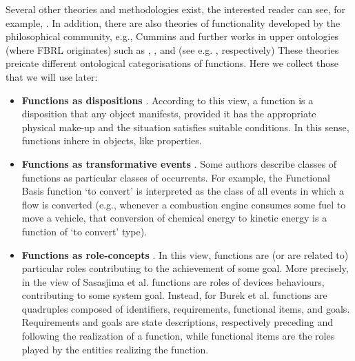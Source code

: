 \documentclass[
]{ceurart}
\begin{document}
Several other theories and methodologies exist, the interested reader can see, for example, \cite{umedaFunctionBehaviourStructure1990,qianFunctionBehaviorStructure1996, zhaoStateBehaviorFunction2019}.
In addition, there are also theories of functionality developed by the philosophical community, e.g., Cummins \cite{cumminsFunctionalAnalysis1975} and further works in upper ontologies (where FBRL originates) such as \BFO, \GFO, \YAMATO and \DOLCE (see e.g. \cite{spearFunctionsBasicFormal2016, herreGeneralFormalOntology2006, sasajimaFBRLFunctionBehavior1995, borgoFormalOntologicalPerspective2009}, respectively)
These theories preicate different ontological categorisations of functions. 
Here we collect those that we will use later:
\begin{itemize}
  \item \textbf{Functions as dispositions} \cite{arpFunctionRoleDisposition2008, barryBasicFormalOntology2015}. According to this view, a function is a disposition that any object manifests, provided it has the appropriate physical make-up and the situation satisfies suitable conditions. In this sense, functions inhere in objects, like properties. 
  \item \textbf{Functions as transformative events} \cite{borgoFormalizationFunctionsOperations2011, garbaczTwoOntologydrivenFormalisations2011, garbaczStandardTaxonomyArtifact2005}.
  Some authors describe classes of functions as particular classes of occurrents. For example, the Functional Basis function `to convert' is interpreted as the class of all events in which a flow is converted (e.g., whenever a combustion engine consumes some fuel to move a vehicle, that conversion of chemical energy to kinetic energy is a function of `to convert' type).%
  \item \textbf{Functions as role-concepts} \cite{sasajimaFBRLFunctionBehavior1995,burekToplevelOntologyFunctions2006}. In this view, functions are (or are related to) particular roles contributing to the achievement of some goal. More precisely, in the view of Sasasjima et al. \cite{sasajimaFBRLFunctionBehavior1995} functions are roles of devices behaviours, contributing to some system goal. Instead, for Burek et al. \cite{burekToplevelOntologyFunctions2006} functions are quadruples composed of identifiers, requirements, functional items, and goals. Requirements and goals are state descriptions, respectively preceding and following the realization of a function, while functional items are the roles played by the entities realizing the function. 
\end{itemize}
\end{document}
